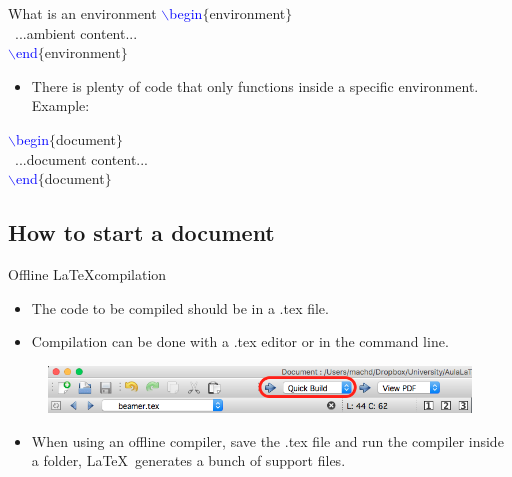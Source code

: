 \documentclass[usenames,dvipsnames,aspectratio=169]{beamer}
\newcommand{\aitem}{\item[$\cdot$]}
\begin{document}

\begin{frame}[t]{What is an environment}
\textcolor{blue}{$\backslash$begin}\textcolor{PineGreen}{$\{$environment$\}$}\\
~...ambient content...\\
\textcolor{blue}{$\backslash$end}\textcolor{PineGreen}{$\{$environment$\}$}
\begin{itemize}
\aitem There is plenty of code that only functions inside a specific environment. Example:
\end{itemize}
\textcolor{blue}{$\backslash$begin}\textcolor{PineGreen}{$\{$document$\}$}\\
~...document content...\\
\textcolor{blue}{$\backslash$end}\textcolor{PineGreen}{$\{$document$\}$}
\end{frame}


\subsection{How to start a document}
\begin{frame}[t]{Offline \LaTeX compilation}
\begin{itemize}
\aitem The code to be compiled should be in a .tex file.
\aitem Compilation can be done with a .tex editor or in the command line.
\end{itemize}
\begin{figure}
\includegraphics[width=\linewidth]{compilar.png}
\end{figure}
\begin{itemize}
\aitem When using an offline compiler, save the .tex file and run the compiler inside a folder, \LaTeX~generates a bunch of support files.
\end{itemize}
\end{frame}
\end{document}
